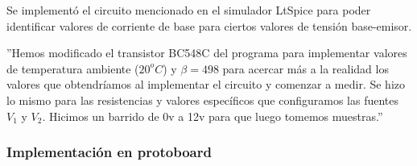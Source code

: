 \sangria{} Se implementó el circuito mencionado en el simulador LtSpice para poder identificar valores de corriente de base para ciertos valores de tensión base-emisor.

''Hemos modificado el transistor BC548C del programa para implementar valores de temperatura ambiente ($20^o C$) y $\beta = 498$ para acercar más a la realidad los valores que obtendríamos al implementar el circuito y comenzar a medir. Se hizo lo mismo para las resistencias y valores específicos que configuramos las fuentes $V_1$ y $V_2$. Hicimos un barrido de 0v a 12v para que luego tomemos muestras.''


\subsubsection{Implementación en protoboard}

